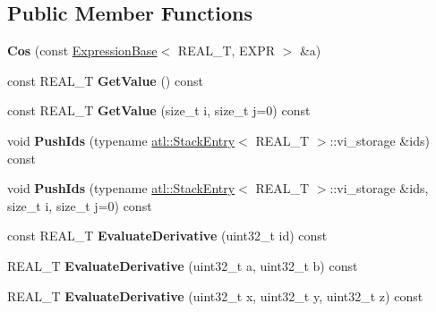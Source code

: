 \subsection*{Public Member Functions}
\begin{DoxyCompactItemize}
\item 
\hypertarget{structatl_1_1_cos_ae15e8fe45ce07f796b8e6b0f3c81a0dc}{{\bfseries Cos} (const \hyperlink{structatl_1_1_expression_base}{Expression\+Base}$<$ R\+E\+A\+L\+\_\+\+T, E\+X\+P\+R $>$ \&a)}\label{structatl_1_1_cos_ae15e8fe45ce07f796b8e6b0f3c81a0dc}

\item 
\hypertarget{structatl_1_1_cos_ace4e1b39754eac681d88a8e51777fe03}{const R\+E\+A\+L\+\_\+\+T {\bfseries Get\+Value} () const }\label{structatl_1_1_cos_ace4e1b39754eac681d88a8e51777fe03}

\item 
\hypertarget{structatl_1_1_cos_a81e3e2ea49369fe0ce486cb49501211b}{const R\+E\+A\+L\+\_\+\+T {\bfseries Get\+Value} (size\+\_\+t i, size\+\_\+t j=0) const }\label{structatl_1_1_cos_a81e3e2ea49369fe0ce486cb49501211b}

\item 
\hypertarget{structatl_1_1_cos_af1f885b1e8af4a022c3a81d901e0705c}{void {\bfseries Push\+Ids} (typename \hyperlink{structatl_1_1_stack_entry}{atl\+::\+Stack\+Entry}$<$ R\+E\+A\+L\+\_\+\+T $>$\+::vi\+\_\+storage \&ids) const }\label{structatl_1_1_cos_af1f885b1e8af4a022c3a81d901e0705c}

\item 
\hypertarget{structatl_1_1_cos_a52e381c8bab1a3e8dd59dda17f39b34b}{void {\bfseries Push\+Ids} (typename \hyperlink{structatl_1_1_stack_entry}{atl\+::\+Stack\+Entry}$<$ R\+E\+A\+L\+\_\+\+T $>$\+::vi\+\_\+storage \&ids, size\+\_\+t i, size\+\_\+t j=0) const }\label{structatl_1_1_cos_a52e381c8bab1a3e8dd59dda17f39b34b}

\item 
\hypertarget{structatl_1_1_cos_a39cf81fb9c6347e40e8d8d3efcdacdf7}{const R\+E\+A\+L\+\_\+\+T {\bfseries Evaluate\+Derivative} (uint32\+\_\+t id) const }\label{structatl_1_1_cos_a39cf81fb9c6347e40e8d8d3efcdacdf7}

\item 
\hypertarget{structatl_1_1_cos_aba2354daf666f9dd363083fea907d281}{R\+E\+A\+L\+\_\+\+T {\bfseries Evaluate\+Derivative} (uint32\+\_\+t a, uint32\+\_\+t b) const }\label{structatl_1_1_cos_aba2354daf666f9dd363083fea907d281}

\item 
\hypertarget{structatl_1_1_cos_a3daf2ee3406609a53b3d875fdf1d7a61}{R\+E\+A\+L\+\_\+\+T {\bfseries Evaluate\+Derivative} (uint32\+\_\+t x, uint32\+\_\+t y, uint32\+\_\+t z) const }\label{structatl_1_1_cos_a3daf2ee3406609a53b3d875fdf1d7a61}


\end{DoxyCompactItemize}
